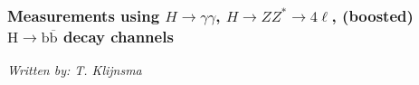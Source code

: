 \newcommand{\bbbar}{\ensuremath{\text{b}\overline{\text{b}}}\xspace}
\newcommand{\Hbb}{\ensuremath{\text{H}\rightarrow\bbbar}\xspace}
\newcommand{\ttbar}{\ensuremath{\text{t}\overline{\text{t}}}\xspace}
\newcommand{\ttH}{\ensuremath{\ttbar\text{H}}\xspace}

\subsubsection{Measurements using $H \to \gamma\gamma$, $H \to ZZ^* \to 4\ell$, (boosted) \Hbb decay channels}
\label{sec:diffxs}

\begin{center}{\it Written by: T. Klijnsma} \end{center}



